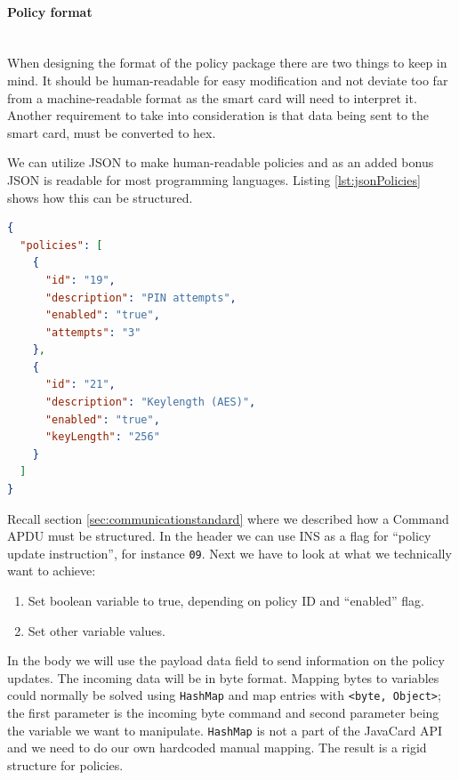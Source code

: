 \newpage

\paragraph{Policy format}\mbox{}\\
When designing the format of the policy package there are two things to keep in mind. It should be human-readable for easy modification and not deviate too far from a machine-readable format as the smart card will need to interpret it. Another requirement to take into consideration is that data being sent to the smart card, must be converted to hex.

We can utilize JSON to make human-readable policies and as an added bonus JSON is readable for most programming languages. Listing \ref{lst:jsonPolicies} shows how this can be structured.
\begin{lstlisting}[language=json,firstnumber=1,caption=Human-readable policies in JSON., label=lst:jsonPolicies,]
{
  "policies": [
    {
      "id": "19",
      "description": "PIN attempts",
      "enabled": "true",
      "attempts": "3"
    },
    {
      "id": "21",
      "description": "Keylength (AES)",
      "enabled": "true",
      "keyLength": "256"
    }
  ]
}
\end{lstlisting}

Recall section \ref{sec:communicationstandard} where we described how a Command APDU must be structured. In the header we can use INS as a flag for ``policy update instruction'', for instance \texttt{09}. Next we have to look at what we technically want to achieve:
\begin{enumerate}
    \item Set boolean variable to true, depending on policy ID and ``enabled'' flag.
    \item Set other variable values.
\end{enumerate}
In the body we will use the payload data field to send information on the policy updates. The incoming data will be in byte format. Mapping bytes to variables could normally be solved using \texttt{HashMap} and map entries with \texttt{<byte, Object>}; the first parameter is the incoming byte command and second parameter being the variable we want to manipulate. \texttt{HashMap} is not a part of the JavaCard API and we need to do our own hardcoded manual mapping. The result is a rigid structure for policies.

